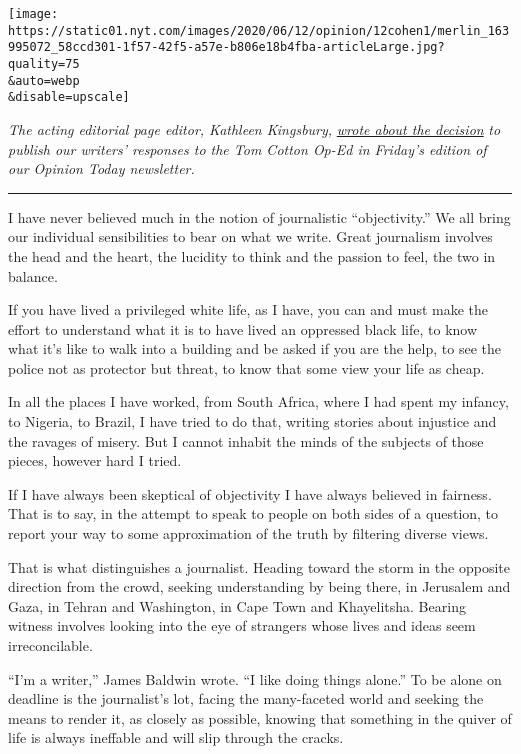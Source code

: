 \texttt{[image: https://static01.nyt.com/images/2020/06/12/opinion/12cohen1/merlin\_163995072\_58ccd301-1f57-42f5-a57e-b806e18b4fba-articleLarge.jpg?quality=75\\\&auto=webp\\\&disable=upscale]}

\emph{The acting editorial page editor, Kathleen Kingsbury,}
\href{https://www.nytimes.com/2020/06/12/opinion/tom-cotton-new-york-times.html}{\emph{wrote
about the decision}} \emph{to publish our writers' responses to the Tom
Cotton Op-Ed in Friday's edition of our Opinion Today newsletter.}

\begin{center}\rule{0.5\linewidth}{\linethickness}\end{center}

I have never believed much in the notion of journalistic
``objectivity.'' We all bring our individual sensibilities to bear on
what we write. Great journalism involves the head and the heart, the
lucidity to think and the passion to feel, the two in balance.

If you have lived a privileged white life, as I have, you can and must
make the effort to understand what it is to have lived an oppressed
black life, to know what it's like to walk into a building and be asked
if you are the help, to see the police not as protector but threat, to
know that some view your life as cheap.

In all the places I have worked, from South Africa, where I had spent my
infancy, to Nigeria, to Brazil, I have tried to do that, writing stories
about injustice and the ravages of misery. But I cannot inhabit the
minds of the subjects of those pieces, however hard I tried.

If I have always been skeptical of objectivity I have always believed in
fairness. That is to say, in the attempt to speak to people on both
sides of a question, to report your way to some approximation of the
truth by filtering diverse views.

That is what distinguishes a journalist. Heading toward the storm in the
opposite direction from the crowd, seeking understanding by being there,
in Jerusalem and Gaza, in Tehran and Washington, in Cape Town and
Khayelitsha. Bearing witness involves looking into the eye of strangers
whose lives and ideas seem irreconcilable.

``I'm a writer,'' James Baldwin wrote. ``I like doing things alone.'' To
be alone on deadline is the journalist's lot, facing the many-faceted
world and seeking the means to render it, as closely as possible,
knowing that something in the quiver of life is always ineffable and
will slip through the cracks.


